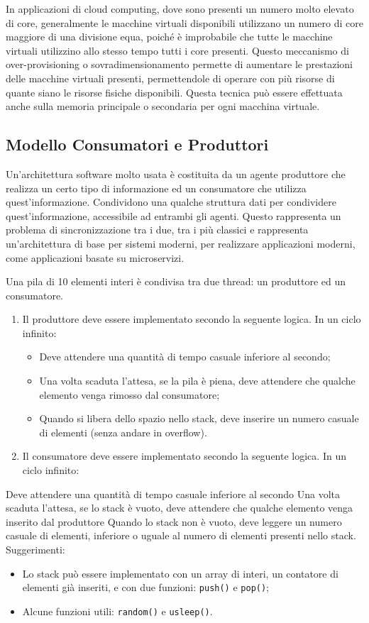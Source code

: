 \documentclass{article}
\numberwithin{equation}{subsection}
\begin{document}
In applicazioni di cloud computing, dove sono presenti un numero molto elevato di core, generalmente le macchine virtuali disponibili utilizzano un numero di core maggiore 
di una divisione equa, poiché è improbabile che tutte le macchine virtuali utilizzino allo stesso tempo tutti i core presenti. Questo meccanismo di over-provisioning o sovradimensionamento permette di aumentare le prestazioni delle macchine virtuali 
presenti, permettendole di operare con più risorse di quante siano le risorse fisiche 
disponibili. Questa tecnica può essere effettuata anche sulla memoria principale o 
secondaria per ogni macchina virtuale. 


\subsection{Modello Consumatori e Produttori}

Un'architettura software molto usata è costituita da un agente produttore che realizza un certo tipo di informazione ed un consumatore che utilizza quest'informazione. 
Condividono una qualche struttura dati per condividere quest'informazione, accessibile ad entrambi gli agenti. Questo rappresenta un problema di sincronizzazione tra i due, tra i più classici e rappresenta un'architettura di base per sistemi moderni, per 
realizzare applicazioni moderni, come applicazioni basate su microservizi. 



Una pila di 10 elementi interi è condivisa tra due thread: un produttore ed un consumatore. 
\begin{enumerate}
    \item Il produttore deve essere implementato secondo la seguente logica. In un ciclo infinito:
    \begin{itemize}
        \item Deve attendere una quantità di tempo casuale inferiore al secondo;
        \item Una volta scaduta l'attesa, se la pila è piena, deve attendere che qualche elemento venga rimosso dal consumatore;
        \item Quando si libera dello spazio nello stack, deve inserire un numero casuale di elementi (senza andare in overflow).
    \end{itemize}
    \item Il consumatore deve essere implementato secondo la seguente logica. In un ciclo infinito:
\end{enumerate}
Deve attendere una quantità di tempo casuale inferiore al secondo
Una volta scaduta l'attesa, se lo stack è vuoto, deve attendere che qualche elemento venga inserito dal produttore
Quando lo stack non è vuoto, deve leggere un numero casuale di elementi, inferiore o uguale al numero di elementi presenti nello stack.
Suggerimenti:
\begin{itemize}
    \item Lo stack può essere implementato con un array di interi, un contatore di elementi già inseriti, e con due funzioni: \verb|push()| e \verb|pop()|;
    \item Alcune funzioni utili: \verb|random()| e \verb|usleep()|.  
\end{itemize}
\end{document}
